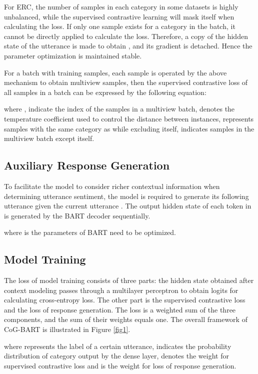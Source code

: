 \documentclass[letterpaper]{article} \usepackage{aaai22}  \usepackage{times}  \usepackage{helvet}  \usepackage{courier}  \usepackage[hyphens]{url}  \usepackage{graphicx} \urlstyle{rm} \def\UrlFont{\rm}  \usepackage{natbib}  \usepackage{caption} \DeclareCaptionStyle{ruled}{labelfont=normalfont,labelsep=colon,strut=off} \frenchspacing  \setlength{\pdfpagewidth}{8.5in}  \setlength{\pdfpageheight}{11in}  \usepackage{algorithm}
\begin{document}
For ERC, the number of samples in each category in some datasets \cite{li-etal-2017-dailydialog} is highly unbalanced, while the supervised contrastive learning will mask itself when calculating the loss. If only one sample exists for a category in the batch, it cannot be directly applied to calculate the loss. Therefore, a copy of the hidden state of the utterance  is made to obtain , and its gradient is detached. Hence the parameter optimization is maintained stable.

For a batch with  training samples, each sample is operated by the above mechanism to obtain multiview  samples, then the supervised contrastive loss of all samples in a batch can be expressed by the following equation:



\noindent where ,  indicate the index of the samples in a multiview batch,  denotes the temperature coefficient used to control the distance between instances,  represents samples with the same category as  while excluding itself,  indicates samples in the multiview batch except itself.

\subsection{Auxiliary Response Generation}
To facilitate the model to consider richer contextual information when determining utterance sentiment, the model is required to generate its following utterance  given the current utterance . The output hidden state of each token in  is generated by the BART decoder sequentially.


\noindent where  is the parameters of BART need to be optimized.

\subsection{Model Training}
The loss of model training consists of three parts: the hidden state  obtained after context modeling passes through a multilayer perceptron to obtain logits for calculating cross-entropy loss. The other part is the supervised contrastive loss and the loss of response generation. The loss is a weighted sum of the three components, and the sum of their weights equals one. The overall framework of CoG-BART is illustrated in Figure \ref{fig1}.



\noindent where  represents the label of a certain utterance,  indicates the probability distribution of category  output by the dense layer,  denotes the weight for supervised contrastive loss and  is the weight for loss of response generation.
\end{document}
